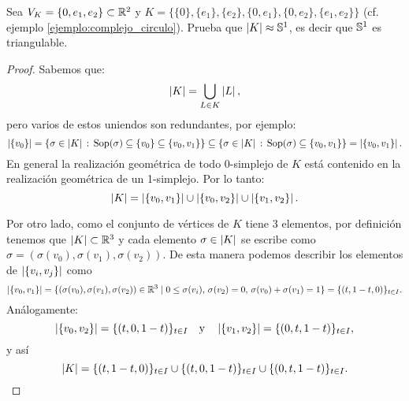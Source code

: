 \begin{ejercicio}\label{ej:50}
  Sea $V_K=\{0,e_1,e_2\}\subset\mathbb{R}^2$ y $K=\{\{0\},\{e_1\},\{e_2\},\{0,e_1\},\{0,e_2\},\{e_1,e_2\}\}$
  (cf. ejemplo \ref{ejemplo:complejo_circulo}). Prueba que $\left| K \right|\approx\mathbb{S}^1$, es decir que
  $\mathbb{S}^1$ es triangulable.
\end{ejercicio}
\begin{proof}%
  Sabemos que:
  \[
		\left| K \right|=\bigcup_{L\in K}\left| L \right|,
  \]
	pero varios de estos uniendos son redundantes, por ejemplo:
	\[
		\left| \{v_0\} \right|=
		\{\sigma\in\left| K \right|\,:\, \text{Sop}(\sigma)\subseteq\{v_0\}\subseteq\{v_0,v_1\}\}\subseteq
		\{\sigma\in\left| K \right|\,:\, \text{Sop}(\sigma)\subseteq\{v_0,v_1\}\}=
		\left| \{v_0,v_1\} \right|.
	\]
	En general la realizaci\'on geom\'etrica de todo 0-simplejo de $K$ est\'a contenido en la realizaci\'on
	geom\'etrica de un 1-simplejo. Por lo tanto:
  \[
		\left| K \right|=\left| \{v_0,v_1\} \right|\cup\left| \{v_0,v_2\} \right|\cup\left| \{v_1,v_2\} \right|.
  \]

	Por otro lado, como el conjunto de v\'ertices de $K$ tiene 3 elementos, por definici\'on tenemos que
	$\left| K \right|\subset\mathbb{R}^3$ y cada elemento $\sigma\in\left| K \right|$ se escribe como
	$\sigma=(\sigma(v_0),\sigma(v_1),\sigma(v_2))$. De esta manera podemos describir los elementos
	de $\left| \{v_i,v_j\} \right|$ como
	\[
		\left| \{v_0,v_1\} \right|=
		\{(\sigma(v_0),\sigma(v_1),\sigma(v_2))\in\mathbb{R}^3\mid 0\leq\sigma(v_i),\,\sigma(v_2)=0,\,\sigma(v_0)+\sigma(v_1)=1\}=
		\{(t,1-t,0)\}_{t\in I}.
	\]
	An\'alogamente:
	\[
		\left| \{v_0,v_2\} \right|=	\{(t,0,1-t)\}_{t\in I} \quad\text{y}\quad \left| \{v_1,v_2\} \right|=\{(0,t,1-t)\}_{t\in I},
	\]
	y as\'i
	\[
		\left| K \right|=\{(t,1-t,0)\}_{t\in I} \cup 	\{(t,0,1-t)\}_{t\in I} \cup \{(0,t,1-t)\}_{t\in I}.
	\]


\end{proof}
